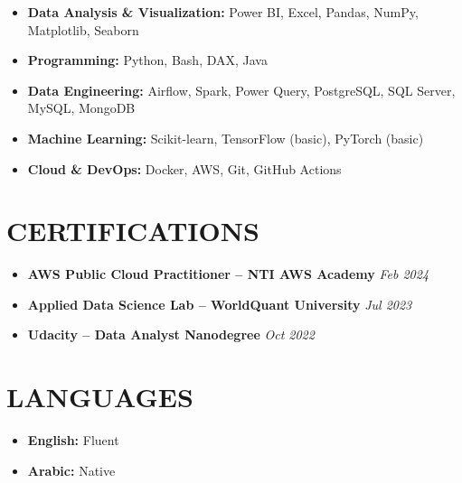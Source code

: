 \documentclass[11pt]{article}
\begin{document}
\begin{itemize}
\item \textbf{Data Analysis \& Visualization:} Power BI, Excel, Pandas, NumPy, Matplotlib, Seaborn
\item \textbf{Programming:} Python, Bash, DAX, Java
\item \textbf{Data Engineering:} Airflow, Spark, Power Query, PostgreSQL, SQL Server, MySQL, MongoDB
\item \textbf{Machine Learning:} Scikit-learn, TensorFlow (basic), PyTorch (basic)
\item \textbf{Cloud \& DevOps:} Docker, AWS, Git, GitHub Actions
\end{itemize}

\section{CERTIFICATIONS}
\begin{itemize}
\item \textbf{AWS Public Cloud Practitioner – NTI AWS Academy} \hfill \textit{Feb 2024}
\item \textbf{Applied Data Science Lab – WorldQuant University} \hfill \textit{Jul 2023}
\item \textbf{Udacity – Data Analyst Nanodegree} \hfill \textit{Oct 2022}
\end{itemize}

\section{LANGUAGES}

\begin{itemize}
\item \textbf{English:} Fluent
\item \textbf{Arabic:} Native
\end{itemize}
\end{document}
